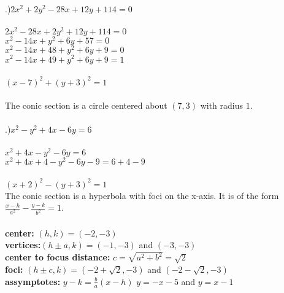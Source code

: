 \documentclass[12pt]{article}
\begin{document}
.)$2x^{2}+2y^{2}-28x+12y+114 = 0$\\\\
$2x^{2}-28x+2y^{2}+12y+114=0$\\
$x^{2}-14x+y^{2}+6y+57=0$\\
$x^{2}-14x+48+y^{2}+6y+9=0$\\
$x^{2}-14x+49+y^{2}+6y+9=1$\\\\
$(x-7)^{2} + (y+3)^{2} = 1$\\\\
The conic section is a circle centered about $(7,3)$ with radius $1$.\\\\



.)$x^{2}-y^{2}+4x-6y = 6$\\\\
$x^{2}+4x-y^{2}-6y=6$\\
$x^{2}+4x+4-y^{2}-6y-9=6+4-9$\\\\
$(x+2)^{2}-(y+3)^{2}=1$\\

\noindent The conic section is a hyperbola with foci on the x-axis. It is of the form $\frac{x-h}{a^{2}} - \frac{y-k}{b^{2}} = 1$.\\\\
\textbf{center:} $(h, k) = (-2, -3)$\\
\textbf{vertices:}$(h\pm a, k)=(-1,-3)$ and $(-3,-3)$\\
\textbf{center to focus distance:} $c=\sqrt{a^{2}+b^{2}} = \sqrt{2}$\\
\textbf{foci:} $(h\pm c, k) = (-2+\sqrt{2}, -3)$ and $(-2-\sqrt{2},-3)$\\
\textbf{assymptotes:} $y-k=\frac{b}{a}(x-h)$\hspace{10pt} $y = -x -5$ and $y = x-1$
\end{document}
